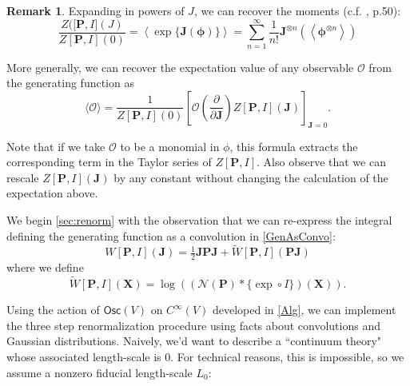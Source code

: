\documentclass[12pt]{article}
\newcounter{counter}
\theoremstyle{definition}
\newtheorem{rmk}[counter]{Remark}
\theoremstyle{plain}
\begin{document}
\begin{rmk}
    Expanding in powers of $J$, we can recover the moments (c.f. \cite{zee2010quantum}, p.50):
\begin{equation}
    \frac{Z(\mathbf[\mathbf{P},I]({J})}{Z[\mathbf{P},I](0)} = \left\langle \exp \{\mathbf{J}(\boldsymbol\phi)\} \right\rangle =
    \sum_{n=1}^\infty \frac{1}{n!} \mathbf{J}^{\otimes n} \left( \left\langle \boldsymbol\phi^{\otimes n} \right\rangle \right)
\end{equation}

More generally, we can recover the expectation value of any observable $\mathcal{O}$ from the generating function as
\begin{equation}\label{eq:ObsZ}
  \langle \mathcal{O} \rangle = \frac{1}{Z[\mathbf{P},I](0)}
  \left[ \mathcal{O}
    \left( \frac{\partial}{\partial\mathbf{J}} \right)
    Z[\mathbf{P},I](\mathbf{J}) \right]_{\mathbf{J} = 0}.
\end{equation}
\end{rmk}

Note that if we take \(\mathcal{O}\) to be a monomial in \(\phi\), this formula extracts the corresponding term in the Taylor series of \(Z[\mathbf{P},I]\). Also observe that we can rescale $Z[\mathbf{P},I](\mathbf{J})$ by any constant without changing the calculation of the expectation above.

We begin \autoref{sec:renorm} with the observation that we can re-express the integral defining the generating function as a convolution in \autoref{GenAsConvo}:
\begin{equation}
    W[\mathbf{P},I](\mathbf{J}) = \tfrac{1}{2} \mathbf{JPJ} + \tilde{W}[\mathbf{P},I](\mathbf{PJ})
\end{equation}
where we define
\begin{equation}
  \tilde{W}[\mathbf{P}, I](\mathbf{X}) =
  \log ((\mathcal{N}(\mathbf{P}) * \{\exp \circ I\})(\mathbf{X})).
\end{equation}

Using the action of $\mathsf{Osc}(V)$ on $C^\infty(V)$ developed in \autoref{Alg}, we can implement the three step renormalization procedure using facts about convolutions and Gaussian distributions.
Naively, we'd want to describe a ``continuum theory" whose associated length-scale is 0. For technical reasons, this is impossible, so we assume a nonzero fiducial length-scale $L_0$:
\end{document}

